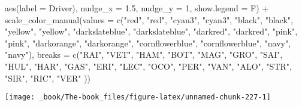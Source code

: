 \documentclass[
]{book}
\newenvironment{Shaded}{\begin{snugshade}}{\end{snugshade}}
\newcommand{\AttributeTok}[1]{\textcolor[rgb]{0.77,0.63,0.00}{#1}}
\newcommand{\DecValTok}[1]{\textcolor[rgb]{0.00,0.00,0.81}{#1}}
\newcommand{\FloatTok}[1]{\textcolor[rgb]{0.00,0.00,0.81}{#1}}
\newcommand{\FunctionTok}[1]{\textcolor[rgb]{0.00,0.00,0.00}{#1}}
\newcommand{\NormalTok}[1]{#1}
\newcommand{\SpecialCharTok}[1]{\textcolor[rgb]{0.00,0.00,0.00}{#1}}
\newcommand{\StringTok}[1]{\textcolor[rgb]{0.31,0.60,0.02}{#1}}
\begin{document}
\begin{Shaded}
\begin{Highlighting}[]
            \FunctionTok{aes}\NormalTok{(}\AttributeTok{label =}\NormalTok{ Driver),}
            \AttributeTok{nudge\_x =} \FloatTok{1.5}\NormalTok{, }\AttributeTok{nudge\_y =} \DecValTok{1}\NormalTok{, }\AttributeTok{show.legend =}\NormalTok{ F) }\SpecialCharTok{+} 
  \FunctionTok{scale\_color\_manual}\NormalTok{(}\AttributeTok{values =} \FunctionTok{c}\NormalTok{(}\StringTok{"red"}\NormalTok{, }\StringTok{"red"}\NormalTok{, }
                                \StringTok{"cyan3"}\NormalTok{, }\StringTok{"cyan3"}\NormalTok{, }
                                \StringTok{"black"}\NormalTok{, }\StringTok{"black"}\NormalTok{, }
                                \StringTok{"yellow"}\NormalTok{, }\StringTok{"yellow"}\NormalTok{,}
                                \StringTok{"darkslateblue"}\NormalTok{, }\StringTok{"darkslateblue"}\NormalTok{,}
                                \StringTok{"darkred"}\NormalTok{, }\StringTok{"darkred"}\NormalTok{, }
                                \StringTok{"pink"}\NormalTok{, }\StringTok{"pink"}\NormalTok{,}
                                \StringTok{"darkorange"}\NormalTok{, }\StringTok{"darkorange"}\NormalTok{,}
                                \StringTok{"cornflowerblue"}\NormalTok{, }\StringTok{"cornflowerblue"}\NormalTok{,}
                                \StringTok{"navy"}\NormalTok{, }\StringTok{"navy"}\NormalTok{),}
                     \AttributeTok{breaks =} \FunctionTok{c}\NormalTok{(}\StringTok{"RAI"}\NormalTok{, }\StringTok{"VET"}\NormalTok{,}
                                \StringTok{"HAM"}\NormalTok{, }\StringTok{"BOT"}\NormalTok{,}
                                \StringTok{"MAG"}\NormalTok{, }\StringTok{"GRO"}\NormalTok{,}
                                \StringTok{"SAI"}\NormalTok{, }\StringTok{"HUL"}\NormalTok{,}
                                \StringTok{"HAR"}\NormalTok{, }\StringTok{"GAS"}\NormalTok{,}
                                \StringTok{"ERI"}\NormalTok{, }\StringTok{"LEC"}\NormalTok{,}
                                \StringTok{"OCO"}\NormalTok{, }\StringTok{"PER"}\NormalTok{,  }
                                \StringTok{"VAN"}\NormalTok{, }\StringTok{"ALO"}\NormalTok{,}
                                \StringTok{"STR"}\NormalTok{, }\StringTok{"SIR"}\NormalTok{,}
                                \StringTok{"RIC"}\NormalTok{, }\StringTok{"VER"}
\NormalTok{                                )) }
\end{Highlighting}
\end{Shaded}

\begin{center}\texttt{[image: \_book/The-book\_files/figure-latex/unnamed-chunk-227-1]} \end{center}
\end{document}

